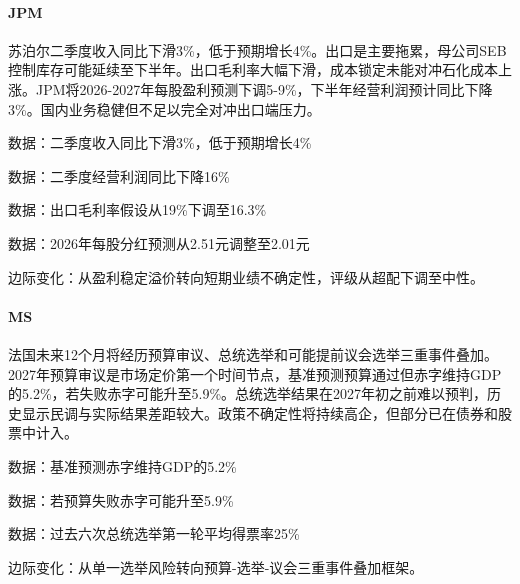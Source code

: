 \documentclass[11pt]{ctexart}
\begin{document}
\paragraph{JPM} 苏泊尔二季度收入同比下滑3\%，低于预期增长4\%。出口是主要拖累，母公司SEB控制库存可能延续至下半年。出口毛利率大幅下滑，成本锁定未能对冲石化成本上涨。JPM将2026-2027年每股盈利预测下调5-9\%，下半年经营利润预计同比下降3\%。国内业务稳健但不足以完全对冲出口端压力。
{\small\color{refgray}数据：二季度收入同比下滑3\%，低于预期增长4\%\par}
{\small\color{refgray}数据：二季度经营利润同比下降16\%\par}
{\small\color{refgray}数据：出口毛利率假设从19\%下调至16.3\%\par}
{\small\color{refgray}数据：2026年每股分红预测从2.51元调整至2.01元\par}
{\small\color{refgray}边际变化：从盈利稳定溢价转向短期业绩不确定性，评级从超配下调至中性。\par}
\paragraph{MS} 法国未来12个月将经历预算审议、总统选举和可能提前议会选举三重事件叠加。2027年预算审议是市场定价第一个时间节点，基准预测预算通过但赤字维持GDP的5.2\%，若失败赤字可能升至5.9\%。总统选举结果在2027年初之前难以预判，历史显示民调与实际结果差距较大。政策不确定性将持续高企，但部分已在债券和股票中计入。
{\small\color{refgray}数据：基准预测赤字维持GDP的5.2\%\par}
{\small\color{refgray}数据：若预算失败赤字可能升至5.9\%\par}
{\small\color{refgray}数据：过去六次总统选举第一轮平均得票率25\%\par}
{\small\color{refgray}边际变化：从单一选举风险转向预算-选举-议会三重事件叠加框架。\par}
\end{document}
